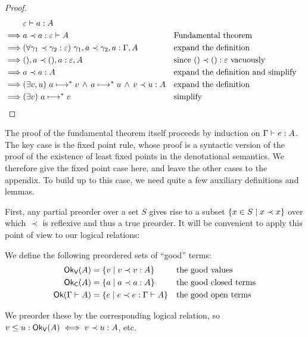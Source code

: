\begin{proof}
\begin{align*}
  & \J{a}{\emptycx}{A}
  \\
  \implies& \oplr{\emptycx \vdash A} a a
  && \text{Fundamental theorem}
  \\
  \implies& \fa{\oplr{\emptycx}{\gamma_1}{\gamma_2}}
  \oplr{\Gamma,A}{\gamma_1,a}{\gamma_2,a}
  && \text{expand the definition}
  \\
  \implies& \oplr{\emptycx,A}{\tuple{},a}{\tuple{},a}
  && \text{since }\oplr{\emptycx}{\tuple{}}{\tuple{}}\text{ vacuously}
  \\
  \implies& \oplrclosed{A} a a
  && \text{expand the definition and simplify}
  \\
  \implies& \ex{v,u} a \evalsto v \wedge a \evalsto u \wedge \oplrvalue A v u
  && \text{expand the definition}
  \\
  \implies& \ex{v} a \evalsto v
  && \text{simplify}
\end{align*}
\end{proof}

\noindent
The proof of the fundamental theorem itself proceeds by induction on ${\Gamma} \vdash {e} \mathrel{:} {A}$.
%
The key case is the fixed point rule, whose proof is a syntactic version of
the proof of the existence of least fixed points in the denotational semantics.
%
We therefore give the fixed point case here, and leave the other cases to the appendix.
%
To build up to this case, we need quite a few auxiliary definitions and lemmas.

\newcommand\goodvalue[1]{\ensuremath{\textsf{Ok}_{\textsf{V}}({#1})}}
\newcommand\goodclosed[1]{\ensuremath{\textsf{Ok}_{\textsf{C}}({#1})}}
\newcommand\goodopen[1]{\ensuremath{\textsf{Ok}({#1})}}

First, any partial preorder over a set $S$ gives rise to a subset $\{x \in S \mathrel{|} x \prec x\}$ over which $\prec$ is reflexive and thus a true preorder. It will be convenient to apply this point of view to our logical relations:

\begin{definition} We define the following preordered sets of ``good'' terms:
  \begin{align*}
    \goodvalue{A} &= \setfor{v}{\oplrvalue A v v}
    &&\text{the good values}
    \\
    \goodclosed{A} &= \setfor{a}{\oplrclosed A a a}
    && \text{the good closed terms}
    \\
    \goodopen{\Gamma \vdash A} &= \setfor{e}{\oplr{\Gamma \vdash A} e e}
    && \text{the good open terms}
  \end{align*}

  \noindent
  We preorder these by the corresponding logical relation, so $v \le u : \goodvalue A \iff \oplrvalue A v u$, etc.
\end{definition}

